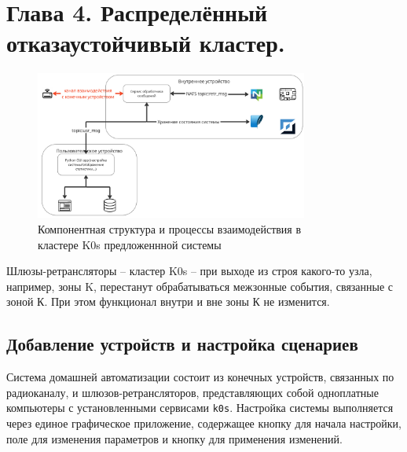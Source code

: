 \documentclass[a4paper,12pt]{article}
\begin{document}
\section{Глава 4. Распределённый отказаустойчивый кластер.}


\begin{figure}[H]
    \centering
    \includegraphics[width=0.8\textwidth]{images/InternalSystemDesign.png}
    \captionsetup{justification=centering}
    \caption{Компонентная структура и процессы взаимодействия в\\кластере K0s предложеннной системы}
    \label{fig:InternalSystemDesign}
\end{figure}


Шлюзы-ретрансляторы -- кластер K0s -- при выходе из строя какого-то узла, например, зоны
K, перестанут обрабатываться межзонные события, связанные с зоной К. При этом функционал внутри и вне зоны
К не изменится.



\subsection{Добавление устройств и настройка сценариев}

Система домашней автоматизации состоит из конечных устройств, связанных по радиоканалу, и шлюзов-ретрансляторов, представляющих собой одноплатные компьютеры с установленными сервисами \texttt{k0s}. Настройка системы выполняется через единое графическое приложение, содержащее кнопку для начала настройки, поле для изменения параметров и кнопку для применения изменений.
\end{document}
